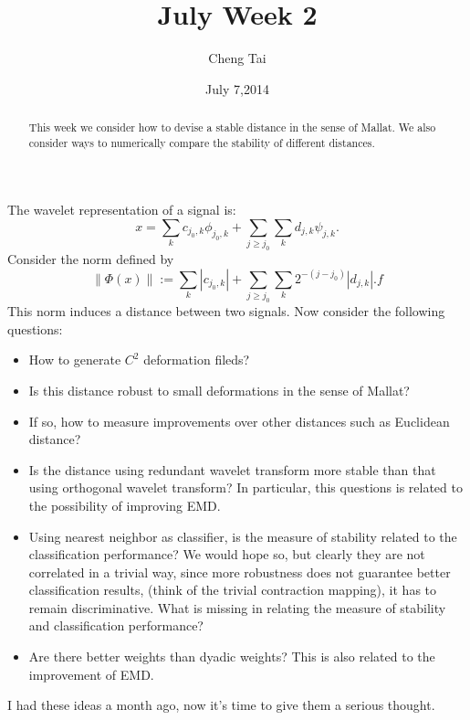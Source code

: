 \documentclass[a4paper]{article}
\title{July Week 2}
\author{Cheng Tai}
\date{July 7,2014}
\begin{document}
\maketitle

\begin{abstract}
This week we consider how to devise a stable distance in the sense of Mallat. We also consider ways to numerically compare the stability of different distances.
\end{abstract}
The wavelet representation of a signal is:
\begin{equation}
	x=\sum_{k} c_{j_0,k} \phi_{j_0,k} + \sum_{j\geq j_0}\sum_{k}d_{j,k}\psi_{j,k}.
\end{equation}
Consider the norm defined by 
\begin{equation}
\|\Phi(x)\|:=\sum_k |c_{j_0,k} | + \sum_{j\geq j_0}\sum_{k}2^{-(j-j_0)}|d_{j,k}|.f
\end{equation}
This norm induces a distance between two signals. Now consider the following questions:
\begin{itemize}
\item How to generate $C^2$ deformation fileds?
\item Is this distance robust to small deformations in the sense of Mallat?
\item If so, how to measure improvements over other distances such as Euclidean distance?
\item Is the distance using redundant wavelet transform more stable than that using orthogonal wavelet transform? In particular, this questions is related to the possibility of improving EMD.
\item Using nearest neighbor as classifier, is the measure of stability related to the classification performance? We would hope so, but clearly they are not correlated in a trivial way, since more robustness does not guarantee better classification results, (think of the trivial contraction mapping), it has to remain discriminative. What is missing in relating the measure of stability and classification performance?
\item Are there better weights than dyadic weights? This is also related to the improvement of EMD.
\end{itemize}
I had these ideas a month ago, now it's time to give them a serious thought.
\end{document}
